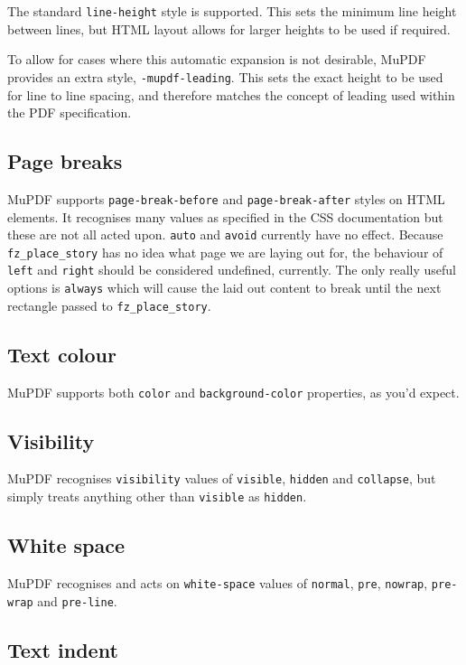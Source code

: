 \documentclass[oneside]{book}
\begin{document}
The standard \texttt{line-height} style is supported. This sets the minimum line height between lines, but HTML layout allows for larger heights to be used if required.

To allow for cases where this automatic expansion is not desirable, MuPDF provides an extra style, \texttt{-mupdf-leading}. This sets the exact height to be used for line to line spacing, and therefore matches the concept of leading used within the PDF specification.

\subsection{Page breaks}

MuPDF supports \texttt{page-break-before} and \texttt{page-break-after} styles on HTML elements. It recognises many values as specified in the CSS documentation but these are not all acted upon. \texttt{auto} and \texttt{avoid} currently have no effect. Because \texttt{fz\_place\_story} has no idea what page we are laying out for, the behaviour of \texttt{left} and \texttt{right} should be considered undefined, currently. The only really useful options is \texttt{always} which will cause the laid out content to break until the next rectangle passed to \texttt{fz\_place\_story}.

\subsection{Text colour}

MuPDF supports both \texttt{color} and \texttt{background-color} properties, as you'd expect.

\subsection{Visibility}

MuPDF recognises \texttt{visibility} values of \texttt{visible}, \texttt{hidden} and \texttt{collapse}, but simply treats anything other than \texttt{visible} as \texttt{hidden}.

\subsection{White space}

MuPDF recognises and acts on \texttt{white-space} values of \texttt{normal}, \texttt{pre}, \texttt{nowrap}, \texttt{pre-wrap} and \texttt{pre-line}.

\subsection{Text indent}
\end{document}
